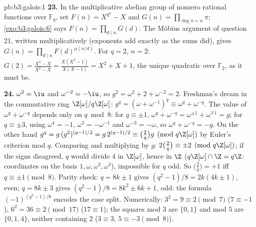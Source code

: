 \begin{solution}{pb:b3:galois:1}
\textbf{23.} In the multiplicative abelian group of nonzero
rational functions over $\mathbb F_q$, set $F(n) = X^{q^n} -
X$ and $G(n) = \prod_{\deg\pi = n}\pi$;
\cref{exo:b3:galois:6} says $F(n) = \prod_{d\mid n}G(d)$.
The M\"obius argument of question 21, written
multiplicatively (exponents add exactly as the sums did),
gives $G(n) = \prod_{d \mid n}F(d)^{\mu(n/d)}$. For $q = 2$,
$n = 2$: $G(2) = \frac{X^4 - X}{X^2 - X} = \frac{X(X^3 -
1)}{X(X - 1)} = X^2 + X + 1$, the unique 
quadratic over $\mathbb F_2$, as it must be.

\textbf{24.} $\omega^2 = \iu$ and $\omega^{-2} = -\iu$, so
$g^2 = \omega^2 + 2 + \omega^{-2} = 2$. Freshman's dream in
the commutative ring $\Z[\omega]/q\Z[\omega]$: $g^q =
(\omega + \omega^{-1})^q \equiv \omega^q + \omega^{-q}$. The
value of $\omega^q + \omega^{-q}$ depends only on $q \bmod 8$:
for $q \equiv \pm1$, $\omega^q + \omega^{-q} = \omega^{\pm1} +
\omega^{\mp1} = g$; for $q \equiv \pm3$, using $\omega^4 =
-1$, $\omega^{3} = -\omega^{-1}$ and $\omega^{-3} = -\omega$,
so $\omega^q + \omega^{-q} = -g$. On the other hand $g^q =
g\,(g^2)^{(q-1)/2} = g\,2^{(q-1)/2} \equiv \bigl(\frac2q\bigr)
g \pmod{q\Z[\omega]}$ by Euler's criterion mod $q$. Comparing
and multiplying by $g$: $2\bigl(\frac2q\bigr) \equiv
\pm2 \pmod{q\Z[\omega]}$; if the signs disagreed, $q$ would
divide $4$ in $\Z[\omega]$, hence in $\Z$ ($q\Z[\omega] \cap
\Z = q\Z$: coordinates on the basis $1, \omega, \omega^2,
\omega^3$), impossible for $q$ odd. So $\bigl(\frac2q\bigr) =
+1$ iff $q \equiv \pm1 \pmod 8$. Parity check: $q = 8k \pm 1$
gives $(q^2 - 1)/8 = 2k(4k \pm 1)$, even; $q = 8k \pm 3$
gives $(q^2 - 1)/8 = 8k^2 \pm 6k + 1$, odd: the formula
$(-1)^{(q^2-1)/8}$ encodes the case split. Numerically: $3^2
= 9 \equiv 2 \pmod 7$ ($7 \equiv -1$), $6^2 = 36 \equiv 2
\pmod{17}$ ($17 \equiv 1$); the squares mod $3$ are $\{0,
1\}$ and mod $5$ are $\{0, 1, 4\}$, neither containing $2$
($3 \equiv 3$, $5 \equiv -3 \pmod 8$).


\end{solution}
